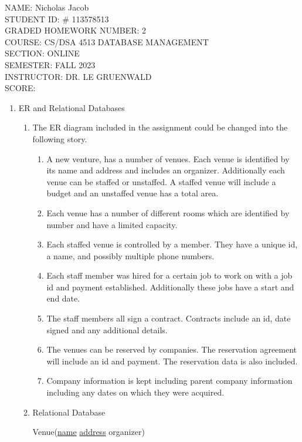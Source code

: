 \documentclass[11pt]{article}
\author{}
\title{}
\begin{document}
{\Large
\noindent NAME:  Nicholas Jacob\\ 
STUDENT ID: \# 113578513\\
GRADED HOMEWORK NUMBER: 2\\
COURSE: CS/DSA 4513 DATABASE MANAGEMENT\\ 
SECTION: ONLINE\\SEMESTER: FALL 2023\\
INSTRUCTOR:  DR. LE GRUENWALD\\
 SCORE:}

\newpage
\begin{enumerate}
\item ER and Relational Databases
\begin{enumerate}
\item The ER diagram included in the assignment could be changed into the following story.
\begin{enumerate}
\item A new venture, has a number of venues.  Each venue is identified by its name and address and includes an organizer.  Additionally each venue can be staffed or unstaffed.  A staffed venue will include a budget and an unstaffed venue has a total area.
\item Each venue has a number of different rooms which are identified by number and have a limited capacity.
\item Each staffed venue is controlled by a member.  They have a unique id, a name, and possibly multiple phone numbers.
\item Each staff member was hired for a certain job to work on with a job id and payment established. Additionally these jobs have a start and end date.
\item The staff members all sign a contract.  Contracts include an id, date signed and any additional details.
\item The venues can be reserved by companies.  The reservation agreement will include an id and payment.  The reservation data is also included.
\item Company information is kept including parent company information including any dates on which they were acquired.
\end{enumerate}
\item Relational Database

Venue(\underline {name} \underline{address} organizer)

\end{enumerate}



\end{enumerate}
\end{document}
